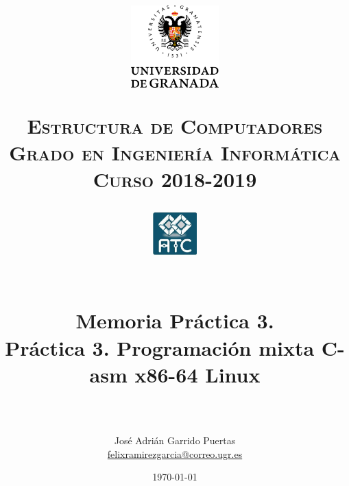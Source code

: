 
\usepackage{url}

\title{	
	\normalfont \normalsize
	\begin{figure}[htb]
		\centering
		\includegraphics[width=0.3\textwidth]{./imagenes/1}
	\end{figure}
	\textsc{\textbf{Estructura de Computadores} \\ Grado en Ingeniería Informática \\ 
	Curso 2018-2019} \\ [25pt] %
	\begin{figure}[htb]
		\centering
		\includegraphics[width=0.15\textwidth]{./imagenes/2}
	\end{figure}
	\horrule{0.5pt} \\[0.4cm] %
	\huge Memoria Práctica 3. \\
	\huge Práctica 3. Programación mixta C-asm x86-64 Linux
	\\ %
	\horrule{2pt} \\[0.5cm] %
}
\author{José Adrián Garrido Puertas \\%
\href{mailto:felixramirezgarcia@correo.ugr.es}{felixramirezgarcia@correo.ugr.es}} %
\date{\normalsize\today} %



	
	\maketitle %
	
